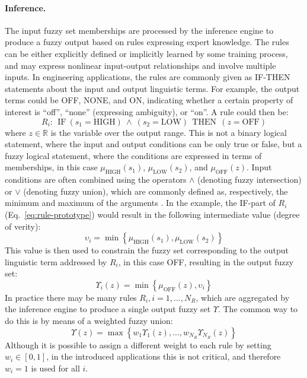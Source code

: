 \paragraph{Inference.} The input fuzzy set memberships are processed by the inference engine to produce a fuzzy output based on rules expressing expert knowledge. The rules can be either explicitly defined or implicitly learned by some training process, and may express nonlinear input-output relationships and involve multiple inputs. In engineering applications, the rules are commonly given as IF-THEN statements about the input and output linguistic terms. For example, the output terms could be OFF, NONE, and ON, indicating whether a certain property of interest is ``off'', ``none'' (expressing ambiguity), or ``on''. A rule could then be:%
\begin{equation}
R_{i} \! : \ \  \textrm{IF} \  (s_{1}=\textrm{HIGH})\ \wedge\ (s_{2}=\textrm{LOW})\ \ \textrm{THEN}\ \ (z=\textrm{OFF})
\label{eq:rule-prototype}
\end{equation}
where $z\in\mathbb{R}$ is the variable over the output range. This is not a binary logical statement, where the input and output conditions can be only true or false, but a fuzzy logical statement, where the conditions are expressed in terms of memberships, in this case $\mu_{\textrm{HIGH}}(s_{1})$, $\mu_{\textrm{LOW}}(s_{2})$, and $\mu_{\textrm{OFF}}(z)$. Input conditions are often combined using the operators $\wedge$ (denoting fuzzy intersection) or $\vee$ (denoting fuzzy union), which are commonly defined as, respectively, the minimum and maximum of the arguments \cite{mendel1995fuzzy}. In the example, the IF-part of $R_{i}$ (Eq.~\ref{eq:rule-prototype}) would result in the following intermediate value (degree of verity):
\begin{equation}
\upsilon_{i} = \min\left\{\mu_{\textrm{HIGH}}(s_{1}),\mu_{\textrm{LOW}}(s_{2})\right\}
\end{equation}
This value is then used to constrain the fuzzy set corresponding to the output linguistic term addressed by $R_{i}$, in this case OFF, resulting in the output fuzzy set:
\begin{equation}
\Upsilon_{\!i}(z) = \min\left\{\mu_{\textrm{OFF}}(z),\upsilon_{i}\right\}
\end{equation}
In practice there may be many rules $R_{i}, i=1,\dots,N_{R}$, which are aggregated by the inference engine to produce a single output fuzzy set $\Upsilon$. The common way to do this \cite{mendel1995fuzzy} is by means of a weighted fuzzy union:
\begin{equation}
\Upsilon(z) = \max\left\{w_{1}\Upsilon_{\!1}(z),\dots,w_{N_{R}}\Upsilon_{\!N_{R}}(z)\right\}
\end{equation}
Although it is possible to assign a different weight to each rule by setting $w_{i}\in[0,1]$, in the introduced applications this is not critical, and therefore $w_{i}=1$ is used for all $i$.

